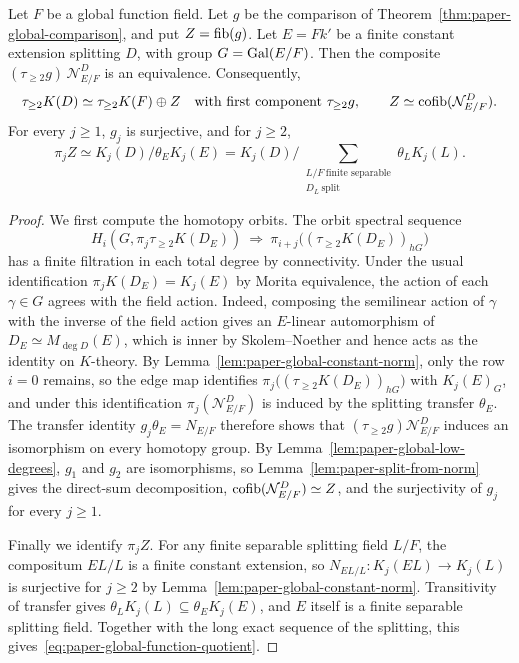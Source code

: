 \begin{theorem}\label{thm:paper-global-function-split}
Let $F$ be a global function field.
Let $g$ be the comparison of Theorem~\ref{thm:paper-global-comparison}, and put $Z=\operatorname{fib}(g)$.
Let $E=Fk'$ be a finite constant extension splitting $D$, with group $G=\operatorname{Gal}(E/F)$.
Then the composite $(\tau_{\ge2}g)\,\mathcal N^{D}_{E/F}$ is an equivalence.
Consequently,
\[
 \tau_{\ge2}K(D)\simeq\tau_{\ge2}K(F)\oplus Z
 \quad\text{with first component }\tau_{\ge2}g,
 \qquad Z\simeq\operatorname{cofib}(\mathcal N^{D}_{E/F}).
\]
For every $j\ge1$, $g_j$ is surjective, and for $j\ge2$,
\begin{equation}\label{eq:paper-global-function-quotient}
 \pi_jZ\simeq K_j(D)\big/\theta_E K_j(E)
  =K_j(D)\Big/\sum_{\substack{L/F\ \text{finite separable}\\ D_L\ \text{split}}}
                            \theta_L K_j(L).
\end{equation}
\end{theorem}
\begin{proof}
We first compute the homotopy orbits.
The orbit spectral sequence
\[
 H_i(G,\pi_j\tau_{\ge2}K(D_E))
 \ \Longrightarrow\ \pi_{i+j}\bigl((\tau_{\ge2}K(D_E))_{hG}\bigr)
\]
has a finite filtration in each total degree by connectivity.
Under the usual identification $\pi_jK(D_E)=K_j(E)$ by Morita equivalence, the action of each $\gamma\in G$ agrees with the field action.
Indeed, composing the semilinear action of $\gamma$ with the inverse of the field action gives an $E$-linear automorphism of $D_E\simeq M_{\deg D}(E)$, which is inner by Skolem--Noether and hence acts as the identity on $K$-theory.
By Lemma~\ref{lem:paper-global-constant-norm}, only the row $i=0$ remains, so the edge map identifies $\pi_j\bigl((\tau_{\ge2}K(D_E))_{hG}\bigr)$ with $K_j(E)_G$, and under this identification $\pi_j(\mathcal N^{D}_{E/F})$ is induced by the splitting transfer $\theta_E$.
The transfer identity $g_j\theta_E=N_{E/F}$ therefore shows that $(\tau_{\ge2}g)\mathcal N^{D}_{E/F}$ induces an isomorphism on every homotopy group.
By Lemma~\ref{lem:paper-global-low-degrees}, $g_1$ and $g_2$ are isomorphisms, so Lemma~\ref{lem:paper-split-from-norm} gives the direct-sum decomposition, $\operatorname{cofib}(\mathcal N^{D}_{E/F})\simeq Z$, and the surjectivity of $g_j$ for every $j\ge1$.

Finally we identify $\pi_jZ$.
For any finite separable splitting field $L/F$, the compositum $EL/L$ is a finite constant extension, so $N_{EL/L}\colon K_j(EL)\to K_j(L)$ is surjective for $j\ge2$ by Lemma~\ref{lem:paper-global-constant-norm}.
Transitivity of transfer gives $\theta_LK_j(L)\subseteq\theta_EK_j(E)$, and $E$ itself is a finite separable splitting field.
Together with the long exact sequence of the splitting, this gives~\eqref{eq:paper-global-function-quotient}.
\end{proof}

